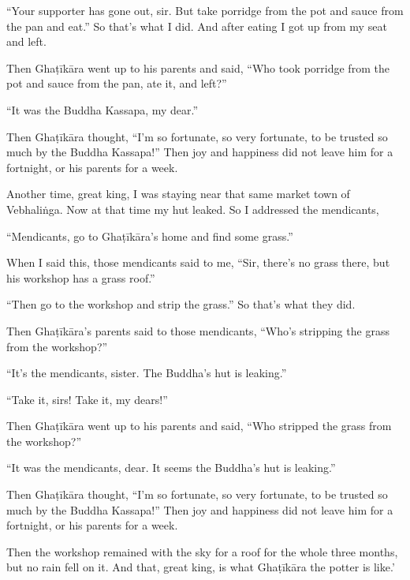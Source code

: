 \documentclass[12pt,openany]{book}%
\begin{document}
“Your supporter has gone out, sir. But take porridge from the pot and sauce from the pan and eat.” So that’s what I did. And after eating I got up from my seat and left. 

Then \textsanskrit{Ghaṭīkāra} went up to his parents and said, “Who took porridge from the pot and sauce from the pan, ate it, and left?” 

“It was the Buddha Kassapa, my dear.” 

Then \textsanskrit{Ghaṭīkāra} thought, “I’m so fortunate, so very fortunate, to be trusted so much by the Buddha Kassapa!” Then joy and happiness did not leave him for a fortnight, or his parents for a week. 

Another time, great king, I was staying near that same market town of \textsanskrit{Vebhaliṅga}. Now at that time my hut leaked. So I addressed the mendicants, 

“Mendicants, go to \textsanskrit{Ghaṭīkāra}’s home and find some grass.” 

When I said this, those mendicants said to me, “Sir, there’s no grass there, but his workshop has a grass roof.” 

“Then go to the workshop and strip the grass.” So that’s what they did. 

Then \textsanskrit{Ghaṭīkāra}’s parents said to those mendicants, “Who’s stripping the grass from the workshop?” 

“It’s the mendicants, sister. The Buddha’s hut is leaking.” 

“Take it, sirs! Take it, my dears!” 

Then \textsanskrit{Ghaṭīkāra} went up to his parents and said, “Who stripped the grass from the workshop?” 

“It was the mendicants, dear. It seems the Buddha’s hut is leaking.” 

Then \textsanskrit{Ghaṭīkāra} thought, “I’m so fortunate, so very fortunate, to be trusted so much by the Buddha Kassapa!” Then joy and happiness did not leave him for a fortnight, or his parents for a week. 

Then the workshop remained with the sky for a roof for the whole three months, but no rain fell on it. And that, great king, is what \textsanskrit{Ghaṭīkāra} the potter is like.’ 
\end{document}
